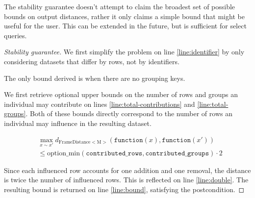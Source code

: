 \documentclass{article}
\begin{document}
The stability guarantee doesn't attempt to claim the broadest set of possible bounds on output distances,
rather it only claims a simple bound that might be useful for the user.
This can be extended in the future, but is sufficient for select queries.

\begin{proof}[Stability guarantee]
    We first simplify the problem on line \ref{line:identifier} by only considering datasets that differ by rows, not by identifiers.
    
    The only bound derived is when there are no grouping keys.

    We first retrieve optional upper bounds on the number of rows and groups an individual may contribute on lines \ref{line:total-contributions} and \ref{line:total-groups}.
    Both of these bounds directly correspond to the number of rows an individual may influence in the resulting dataset.
    
    \begin{align}
        &\max_{x \sim x'} d_{\mathrm{FrameDistance<M>}}(\texttt{function}(x), \texttt{function}(x')) \\
        &\le \mathrm{option\_min}(\texttt{contributed\_rows}, \texttt{contributed\_groups}) \cdot 2
    \end{align}

    Since each influenced row accounts for one addition and one removal, the distance is twice the number of influenced rows.
    This is reflected on line \ref{line:double}.
    The resulting bound is returned on line \ref{line:bound}, satisfying the postcondition.
\end{proof}
\end{document}
